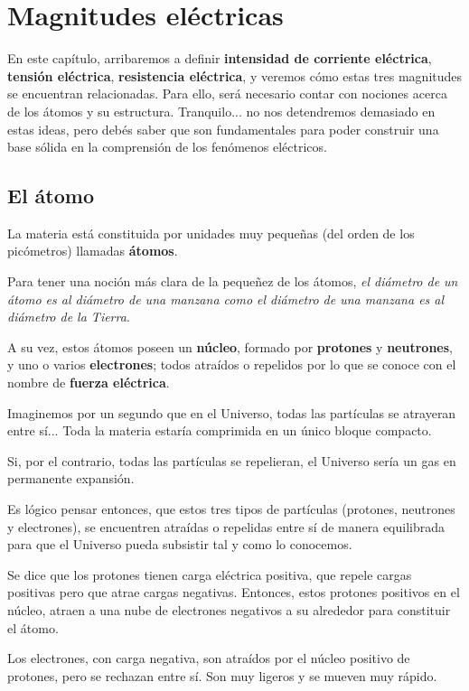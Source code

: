\chapter{Magnitudes eléctricas}

En este capítulo, arribaremos a definir \textbf{intensidad de corriente eléctrica}, \textbf{tensión eléctrica}, \textbf{resistencia eléctrica}, y veremos cómo estas tres magnitudes se encuentran relacionadas. Para ello, será necesario contar con nociones acerca de los átomos y su estructura. Tranquilo... no nos detendremos demasiado en estas ideas, pero debés saber que son fundamentales para poder construir una base sólida en la comprensión de los fenómenos eléctricos.

\section{El átomo}

La materia está constituida por unidades muy pequeñas (del orden de los picómetros) llamadas \textbf{átomos}.

Para tener una noción más clara de la pequeñez de los átomos, \textit{el diámetro de un átomo es al diámetro de una manzana como el diámetro de una manzana es al diámetro de la Tierra}.

A su vez, estos átomos poseen un \textbf{núcleo}, formado por \textbf{protones} y \textbf{neutrones}, y uno o varios \textbf{electrones}; todos atraídos o repelidos por lo que se conoce con el nombre de \textbf{fuerza eléctrica}.

Imaginemos por un segundo que en el Universo, todas las partículas se atrayeran entre sí... Toda la materia estaría comprimida en un único bloque compacto.

Si, por el contrario, todas las partículas se repelieran, el Universo sería un gas en permanente expansión.

Es lógico pensar entonces, que estos tres tipos de partículas (protones, neutrones y electrones), se encuentren atraídas o repelidas entre sí de manera equilibrada para que el Universo pueda subsistir tal y como lo conocemos.

Se dice que los protones tienen carga eléctrica positiva, que repele cargas positivas pero que atrae cargas negativas. Entonces, estos protones positivos en el núcleo, atraen a una nube de electrones negativos a su alrededor para constituir el átomo.

Los electrones, con carga negativa, son atraídos por el núcleo positivo de protones, pero se rechazan entre sí. Son muy ligeros y se mueven muy rápido. 

